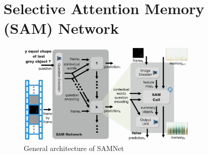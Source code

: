 \section{Selective Attention Memory (SAM) Network}



\begin{figure}
	\centering
	\includegraphics[width=0.78\textwidth]{../img/architecture/samnet_architecture4}
	\caption{General architecture of SAMNet}
	\label{fig:samnet}
\end{figure}

